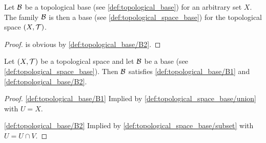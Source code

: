 \begin{proposition}\label{thm:topological_base_is_topological_space_base}
  Let $\mathcal B$ be a topological base (see \cref{def:topological_base}) for an arbitrary set $X$. The family $\mathcal B$ is then a base (see \cref{def:topological_space_base}) for the topological space $(X, \mathcal T)$.
\end{proposition}
\begin{proof}
   is obvious by \ref{def:topological_base/B2}.
\end{proof}

\begin{proposition}\label{thm:topological_space_base_is_topological_base}
  Let $(X, \mathcal T)$ be a topological space and let $\mathcal B$ be a base (see \cref{def:topological_space_base}). Then $\mathcal B$ satisfies \ref{def:topological_base/B1} and \ref{def:topological_base/B2}.
\end{proposition}
\begin{proof}
  \item[\ref{def:topological_base/B1}] Implied by \cref{def:topological_space_base/union} with $U = X$.
  \item[\ref{def:topological_base/B2}] Implied by \cref{def:topological_space_base/subset} with $U = U \cap V$.
\end{proof}
